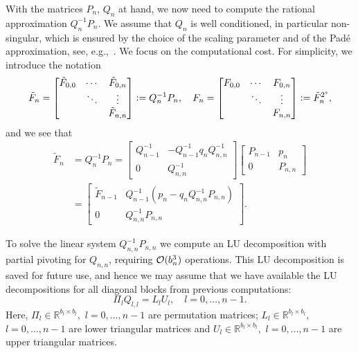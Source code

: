 With the matrices $P_n$, $Q_n$ at hand, we now need to compute the
rational approximation $Q_n^{-1} P_n$. 
We assume that $Q_n$ is well
conditioned, in particular non-singular, which is ensured by the choice of the 
scaling parameter and of the Pad\'e approximation, see, e.g.,~\cite{Higham2009}.
We focus on the computational cost.
For simplicity, we introduce the notation
\begin{equation*}
    \tilde{F}_n = 
    \begin{bmatrix}
        \tilde{F}_{0,0} &  \cdots & \tilde{F}_{0,n} \\
                        &  \ddots & \vdots  \\
                        &         & \tilde{F}_{n,n} \\
    \end{bmatrix}
    \mathrel{\mathop:}= Q_n^{-1} P_n,
    \quad
    F_n = 
    \begin{bmatrix}
        F_{0,0} &  \cdots & F_{0,n} \\
                &  \ddots & \vdots  \\
                &         & F_{n,n} \\
    \end{bmatrix}
    \mathrel{\mathop:}= \tilde{F}_n^{2^s},
\end{equation*}
and we see that
\begin{equation}
    \label{eq:F_n_tilde}
    \begin{split}
    \tilde{F}_n & = Q_n^{-1} P_n =
    \begin{bmatrix}
        Q_{n-1}^{-1} & - Q_{n-1}^{-1} q_n Q_{n,n}^{-1} \\
        0            & Q_{n,n}^{-1}
    \end{bmatrix}
    \begin{bmatrix}
        P_{n-1} & p_n \\
        0       & P_{n,n}
    \end{bmatrix}\\
    & =
    \begin{bmatrix}
        \tilde{F}_{n-1} & Q_{n-1}^{-1} ( p_n - q_n Q_{n,n}^{-1} P_{n,n} ) \\
        0               & Q_{n,n}^{-1} P_{n,n}
    \end{bmatrix}.
    \end{split}
\end{equation}

To solve the linear system $Q_{n,n}^{-1} P_{n,n}$ we compute an LU
decomposition with partial pivoting for
$Q_{n,n}$, requiring ${\mathcal O}(b_n^3)$ operations.
This LU decomposition is saved for future use, and hence we may assume
that we have available the LU decompositions for all diagonal
blocks from previous computations:
\begin{equation}
    \label{eq:store_lu}
    \Pi_l Q_{l,l}= L_l U_l, \quad l=0, \dotsc, n-1.
\end{equation}
Here, $\Pi_l \in \mathbb{R}^{b_l \times b_l},$ $l=0, \dotsc, n-1$ are permutation matrices; 
$L_l\in \mathbb{R}^{b_l \times b_l},$ $l=0, \dotsc, n-1$ are lower triangular matrices and $U_l\in \mathbb{R}^{b_l \times b_l},$ $l=0, \dotsc, n-1$ are upper triangular matrices.

